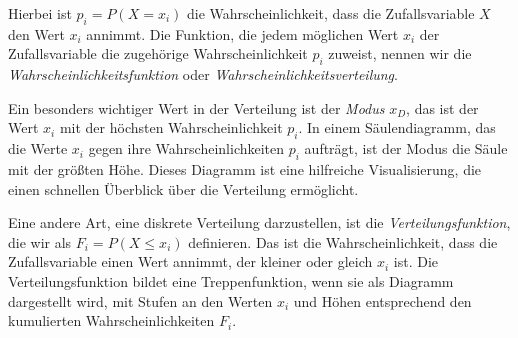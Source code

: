 Hierbei ist $p_i = P(X=x_i)$ die Wahrscheinlichkeit, dass die Zufallsvariable $X$ den Wert $x_i$ annimmt.
Die Funktion, die jedem möglichen Wert $x_i$ der Zufallsvariable die zugehörige Wahrscheinlichkeit $p_i$ zuweist, nennen wir die \textit{Wahrscheinlichkeitsfunktion} oder \textit{Wahrscheinlichkeitsverteilung}.

Ein besonders wichtiger Wert in der Verteilung ist der \textit{Modus} $x_D$, das ist der Wert $x_i$ mit der höchsten Wahrscheinlichkeit $p_i$.
In einem Säulendiagramm, das die Werte $x_i$ gegen ihre Wahrscheinlichkeiten $p_i$ aufträgt, ist der Modus die Säule mit der größten Höhe.
Dieses Diagramm ist eine hilfreiche Visualisierung, die einen schnellen Überblick über die Verteilung ermöglicht.

Eine andere Art, eine diskrete Verteilung darzustellen, ist die \textit{Verteilungsfunktion}, die wir als $F_i = P(X \leq x_i)$ definieren.
Das ist die Wahrscheinlichkeit, dass die Zufallsvariable einen Wert annimmt, der kleiner oder gleich $x_i$ ist.
Die Verteilungsfunktion bildet eine Treppenfunktion, wenn sie als Diagramm dargestellt wird, mit Stufen an den Werten $x_i$ und Höhen entsprechend den kumulierten Wahrscheinlichkeiten $F_i$.

